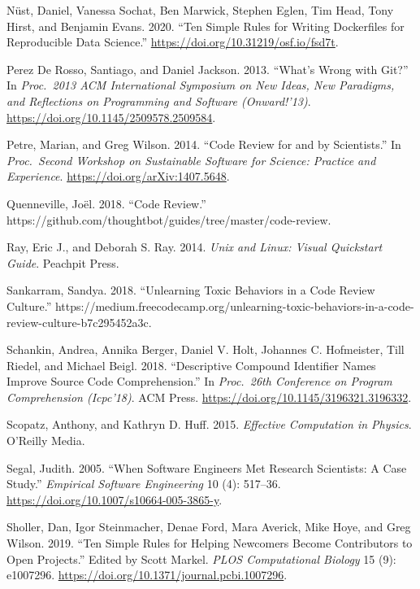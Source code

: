 \documentclass[
]{krantz}
\newlength{\cslhangindent}
\newenvironment{cslreferences}%
  {\setlength{\parindent}{0pt}%
  \everypar{\setlength{\hangindent}{\cslhangindent}}\ignorespaces}%
  {\par}
\begin{document}
\begin{cslreferences}
\leavevmode\hypertarget{ref-Nust2020}{}%
Nüst, Daniel, Vanessa Sochat, Ben Marwick, Stephen Eglen, Tim Head, Tony Hirst, and Benjamin Evans. 2020. ``Ten Simple Rules for Writing Dockerfiles for Reproducible Data Science.'' \url{https://doi.org/10.31219/osf.io/fsd7t}.

\leavevmode\hypertarget{ref-Pere2013}{}%
Perez De Rosso, Santiago, and Daniel Jackson. 2013. ``What's Wrong with Git?'' In \emph{Proc.~2013 ACM International Symposium on New Ideas, New Paradigms, and Reflections on Programming and Software (Onward!'13)}. \url{https://doi.org/10.1145/2509578.2509584}.

\leavevmode\hypertarget{ref-Petr2014}{}%
Petre, Marian, and Greg Wilson. 2014. ``Code Review for and by Scientists.'' In \emph{Proc.~Second Workshop on Sustainable Software for Science: Practice and Experience}. \url{https://doi.org/arXiv:1407.5648}.

\leavevmode\hypertarget{ref-Quen2018}{}%
Quenneville, Joël. 2018. ``Code Review.'' https://github.com/thoughtbot/guides/tree/master/code-review.

\leavevmode\hypertarget{ref-Ray2014}{}%
Ray, Eric J., and Deborah S. Ray. 2014. \emph{Unix and Linux: Visual Quickstart Guide}. Peachpit Press.

\leavevmode\hypertarget{ref-Sank2018}{}%
Sankarram, Sandya. 2018. ``Unlearning Toxic Behaviors in a Code Review Culture.'' https://medium.freecodecamp.org/unlearning-toxic-behaviors-in-a-code-review-culture-b7c295452a3c.

\leavevmode\hypertarget{ref-Scha2018}{}%
Schankin, Andrea, Annika Berger, Daniel V. Holt, Johannes C. Hofmeister, Till Riedel, and Michael Beigl. 2018. ``Descriptive Compound Identifier Names Improve Source Code Comprehension.'' In \emph{Proc.~26th Conference on Program Comprehension (Icpc'18)}. ACM Press. \url{https://doi.org/10.1145/3196321.3196332}.

\leavevmode\hypertarget{ref-Scop2015}{}%
Scopatz, Anthony, and Kathryn D. Huff. 2015. \emph{Effective Computation in Physics}. O'Reilly Media.

\leavevmode\hypertarget{ref-Sega2005}{}%
Segal, Judith. 2005. ``When Software Engineers Met Research Scientists: A Case Study.'' \emph{Empirical Software Engineering} 10 (4): 517--36. \url{https://doi.org/10.1007/s10664-005-3865-y}.

\leavevmode\hypertarget{ref-Shol2019}{}%
Sholler, Dan, Igor Steinmacher, Denae Ford, Mara Averick, Mike Hoye, and Greg Wilson. 2019. ``Ten Simple Rules for Helping Newcomers Become Contributors to Open Projects.'' Edited by Scott Markel. \emph{PLOS Computational Biology} 15 (9): e1007296. \url{https://doi.org/10.1371/journal.pcbi.1007296}.


\end{cslreferences}
\end{document}
